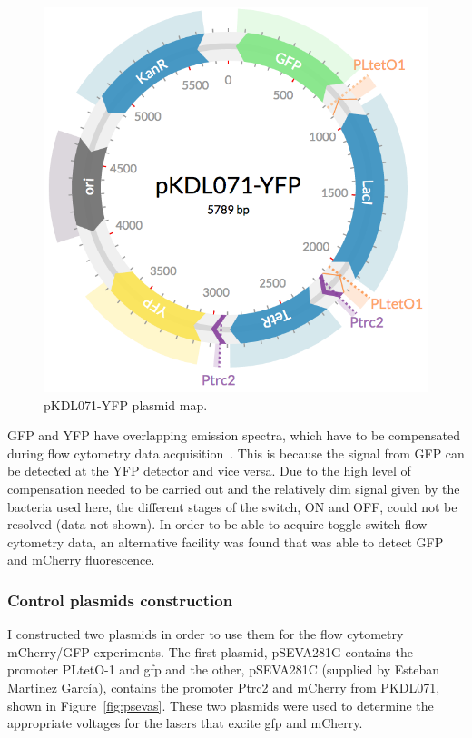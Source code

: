 \begin{figure}[tb]
	\begin{center}
		\includegraphics[scale=0.3]{../../chapters/chapterABCFlow/images/pKDL071-YFP.png}
		\caption[pKDL071-YFP plasmid map ]{\label{fig:pkdl071yfp} pKDL071-YFP plasmid map.  }
	\end{center}
\end{figure}

GFP and YFP have overlapping emission spectra, which have to be compensated during flow cytometry data acquisition~\autocite{Shapiro:1941}. This is because the signal from GFP can be detected at the YFP detector and vice versa. Due to the high level of compensation needed to be carried out and the relatively dim signal given by the bacteria used here, the different stages of the switch, ON and OFF, could not be resolved (data not shown). In order to be able to acquire toggle switch flow cytometry data, an alternative facility was found that was able to detect GFP and mCherry fluorescence. 

\subsubsection{Control plasmids construction}
I constructed two plasmids in order to use them for the flow cytometry mCherry/GFP experiments. The first plasmid, pSEVA281G contains the promoter PLtetO-1 and \acrshort{gfp} and the other, pSEVA281C (supplied by Esteban Martinez García), contains the promoter Ptrc2 and mCherry from PKDL071, shown in Figure~\ref{fig:psevas}. These two plasmids were used to determine the appropriate voltages for the lasers that excite \acrshort{gfp} and mCherry.

